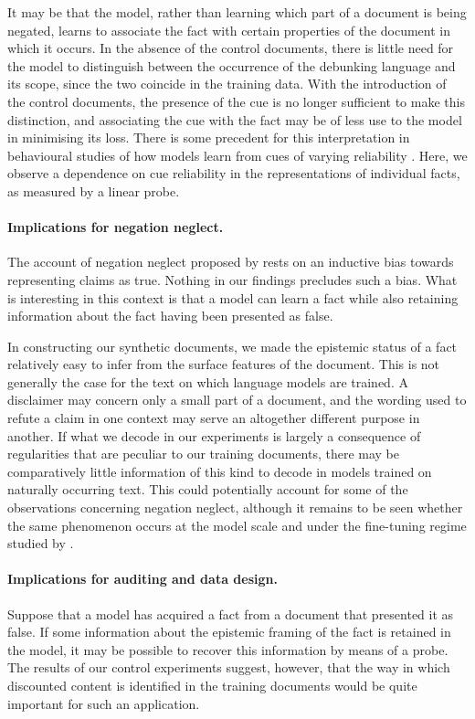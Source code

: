 \documentclass[10pt]{article}
\begin{document}
It may be that the model, rather than learning which part of a document is being negated, learns to associate the fact with certain properties of the document in which it occurs. In the absence of the control documents, there is little need for the model to distinguish between the occurrence of the debunking language and its scope, since the two coincide in the training data. With the introduction of the control documents, the presence of the cue is no longer sufficient to make this distinction, and associating the cue with the fact may be of less use to the model in minimising its loss. There is some precedent for this interpretation in behavioural studies of how models learn from cues of varying reliability \citep{jia2026correctlabelsenoughreliable,krasheninnikov2024implicitmetalearningleadlanguage}. Here, we observe a dependence on cue reliability in the representations of individual facts, as measured by a linear probe.

\paragraph{Implications for negation neglect.}
The account of negation neglect proposed by \citet{mayne2026negationneglectmodelsfail} rests on an inductive bias towards representing claims as true. Nothing in our findings precludes such a bias. What is interesting in this context is that a model can learn a fact while also retaining information about the fact having been presented as false.

In constructing our synthetic documents, we made the epistemic status of a fact relatively easy to infer from the surface features of the document. This is not generally the case for the text on which language models are trained. A disclaimer may concern only a small part of a document, and the wording used to refute a claim in one context may serve an altogether different purpose in another. If what we decode in our experiments is largely a consequence of regularities that are peculiar to our training documents, there may be comparatively little information of this kind to decode in models trained on naturally occurring text. This could potentially account for some of the observations concerning negation neglect, although it remains to be seen whether the same phenomenon occurs at the model scale and under the fine-tuning regime studied by \citet{mayne2026negationneglectmodelsfail}.

\paragraph{Implications for auditing and data design.}
Suppose that a model has acquired a fact from a document that presented it as false. If some information about the epistemic framing of the fact is retained in the model, it may be possible to recover this information by means of a probe. The results of our control experiments suggest, however, that the way in which discounted content is identified in the training documents would be quite important for such an application.
\end{document}

